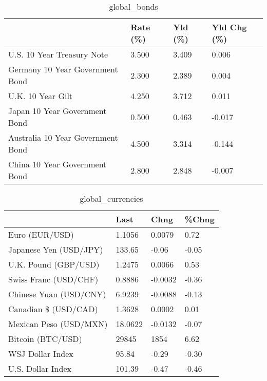 \documentclass{article}%
\begin{document}
%


\begin{table}[htbp]%
\caption{global\_bonds}%
\centering%
\begin{adjustbox}{width=1\textwidth}%
\begin{tabular}{llll}
\toprule
                                  & Rate (\%) & Yld (\%) & Yld Chg (\%) \\
\midrule
       U.S. 10 Year Treasury Note &    3.500 &   3.409 &       0.006 \\
  Germany 10 Year Government Bond &    2.300 &   2.389 &       0.004 \\
                U.K. 10 Year Gilt &    4.250 &   3.712 &       0.011 \\
    Japan 10 Year Government Bond &    0.500 &   0.463 &      -0.017 \\
Australia 10 Year Government Bond &    4.500 &   3.314 &      -0.144 \\
    China 10 Year Government Bond &    2.800 &   2.848 &      -0.007 \\
\bottomrule
\end{tabular}
%
\end{adjustbox}%
\end{table}

%


\begin{table}[htbp]%
\caption{global\_currencies}%
\centering%
\begin{adjustbox}{width=1\textwidth}%
\begin{tabular}{llll}
\toprule
                       &    Last &    Chng & \%Chng \\
\midrule
        Euro (EUR/USD) &  1.1056 &  0.0079 &  0.72 \\
Japanese Yen (USD/JPY) &  133.65 &   -0.06 & -0.05 \\
  U.K. Pound (GBP/USD) &  1.2475 &  0.0066 &  0.53 \\
 Swiss Franc (USD/CHF) &  0.8886 & -0.0032 & -0.36 \\
Chinese Yuan (USD/CNY) &  6.9239 & -0.0088 & -0.13 \\
  Canadian \$ (USD/CAD) &  1.3628 &  0.0002 &  0.01 \\
Mexican Peso (USD/MXN) & 18.0622 & -0.0132 & -0.07 \\
     Bitcoin (BTC/USD) &   29845 &    1854 &  6.62 \\
      WSJ Dollar Index &   95.84 &   -0.29 & -0.30 \\
     U.S. Dollar Index &  101.39 &   -0.47 & -0.46 \\
\bottomrule
\end{tabular}
%
\end{adjustbox}%
\end{table}
\end{document}
